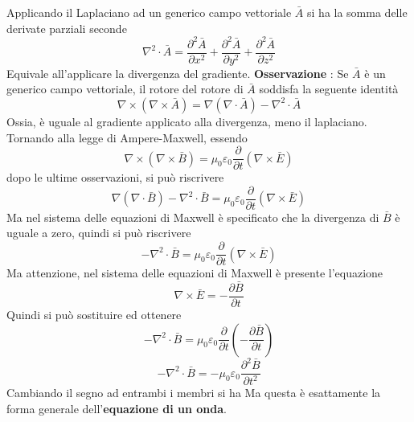 \documentclass[10pt, letterpaper]{report}
\begin{document}
Applicando il Laplaciano ad un generico campo vettoriale $\bar A$ si ha la somma delle derivate parziali seconde
$$\nabla^2\cdot\bar A = \frac{\partial^2\bar A}{\partial x^2}+\frac{\partial^2\bar A}{\partial y^2}+\frac{\partial^2\bar A}{\partial z^2} $$
Equivale all'applicare la divergenza del gradiente.\acc 
\textbf{Osservazione} : Se $\bar A$ è un generico campo vettoriale, il rotore del rotore di $\bar A$ soddisfa la seguente identità 
$$\nabla \times (\nabla \times \bar A )=\nabla(\nabla \cdot \bar A)-\nabla^2\cdot \bar A $$
Ossia, è uguale al gradiente applicato alla divergenza, meno il laplaciano. Tornando alla legge di Ampere-Maxwell, essendo 
$$\nabla \times(\nabla \times \bar B )= \mu_0 \varepsilon_0 \dfrac{\partial }{\partial t}(\nabla \times \bar E)$$
dopo le ultime osservazioni, si può riscrivere 
$$ \nabla(\nabla \cdot \bar B)-\nabla^2\cdot \bar B=\mu_0 \varepsilon_0 \dfrac{\partial}{\partial t}(\nabla \times \bar E)$$ 
Ma nel sistema delle equazioni di Maxwell è specificato che la divergenza di $\bar B$ è uguale a zero, quindi si può riscrivere 
$$ -\nabla^2\cdot \bar B=\mu_0 \varepsilon_0 \dfrac{\partial }{\partial t}(\nabla \times \bar E)$$ 
Ma attenzione, nel sistema delle equazioni di Maxwell è presente l'equazione
$$\nabla \times \bar E = -\dfrac{\partial \bar B }{\partial t}$$ 
Quindi si può sostituire ed ottenere 
$$ -\nabla^2\cdot \bar B=\mu_0 \varepsilon_0 \dfrac{\partial }{\partial t}(-\dfrac{\partial \bar B }{\partial t})$$ 
$$ -\nabla^2\cdot \bar B=-\mu_0 \varepsilon_0 \dfrac{\partial^2\bar B}{\partial t^2}$$ 
Cambiando il segno ad entrambi i membri si ha 
Ma questa è esattamente la forma generale dell'\textbf{equazione di un onda}.
\end{document}

